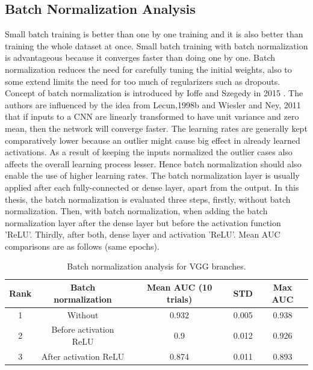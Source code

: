 \subsection{Batch Normalization Analysis}
Small batch training is better than one by one training and it is also better than
training the whole dataset at once. Small batch training with batch normalization is advantageous because it converges faster than doing one by one. Batch normalization reduces the need for carefully tuning the 
initial weights, also to some extend limits the need for too much of regularizers such as dropouts. Concept of batch normalization is introduced by Ioffe and Szegedy in 2015 \cite{ioffe2015batch}. 
The authors are influenced by the idea from Lecun,1998b \cite{lecun1998gradient} and Wiesler and Ney, 2011 \cite{wiesler2011convergence} that if inputs to a CNN are linearly transformed to have unit 
variance and zero mean, then the network will converge faster. The learning rates are generally kept comparatively lower because 
an outlier might cause big effect in already learned activations. As a result of keeping the inputs normalized the outlier cases also affects the overall learning process lesser. Hence batch normalization
should also enable the use of higher learning rates. The batch normalization layer is usually applied after each fully-connected or dense layer, apart from the output. In this thesis, the batch normalization is evaluated three steps,
firstly, without batch normalization. 
Then, with batch normalization, when adding the batch normalization layer after the dense layer but before the activation function 'ReLU'. Thirdly, after both, dense layer and activation 'ReLU'. Mean AUC comparisons are as follows
(same epochs).

\begin{table}[ht]
 \centering
  \caption{Batch normalization analysis for VGG branches.}
  \begin{tabular}{|c c c c c|} 
   \hline\hline
   \rowcolor{lightgrey}
   Rank & Batch normalization & Mean AUC (10 trials) & STD & Max AUC\\[0.5ex] 
   \hline
   1 & Without & 0.932 & 0.005 & 0.938\\   
   \hline
   2 & Before activation ReLU & 0.9 & 0.012 & 0.926\\  
   \hline
   3 & After activation ReLU & 0.874 & 0.011 & 0.893\\  
   \hline \hline
  \end{tabular}
 \label{table:batch_normalization_contrastive}
\end{table}

